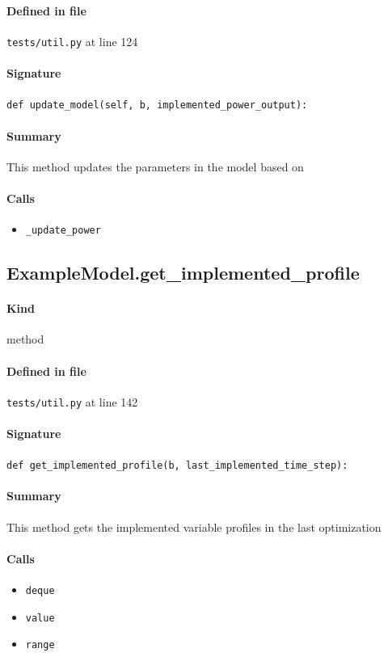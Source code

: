 \documentclass[11pt]{report}
\begin{document}
\paragraph{Defined in file} \texttt{tests/util.py} at line 124
\paragraph{Signature} \texttt{def update\_model(self, b, implemented\_power\_output):}
\paragraph{Summary} This method updates the parameters in the model based on
\paragraph{Calls}
\begin{itemize}[leftmargin=*]
  \item \texttt{\_update\_power}
\end{itemize}
\subsection{ExampleModel.get\_implemented\_profile}
\label{def:tests-util.py:ExampleModel.get_implemented_profile:L142}
\paragraph{Kind} method
\paragraph{Defined in file} \texttt{tests/util.py} at line 142
\paragraph{Signature} \texttt{def get\_implemented\_profile(b, last\_implemented\_time\_step):}
\paragraph{Summary} This method gets the implemented variable profiles in the last optimization
\paragraph{Calls}
\begin{itemize}[leftmargin=*]
  \item \texttt{deque}
  \item \texttt{value}
  \item \texttt{range}
\end{itemize}
\end{document}
